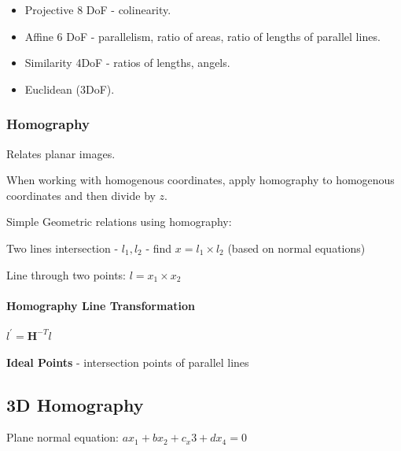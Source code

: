 \begin{itemize}
\item Projective 8 DoF - colinearity.
\item Affine 6 DoF - parallelism, ratio of areas, ratio of lengths of parallel lines.
\item Similarity 4DoF - ratios of lengths, angels.
\item Euclidean (3DoF).
\end{itemize}



\subsubsection{Homography}

Relates planar images.

When working with homogenous coordinates, apply homography to homogenous coordinates and then divide by $z$.

Simple Geometric relations using homography:

Two lines intersection - $l_1,l_2$ - find $x = l_1 \times l_2$  (based on normal equations)

Line through two points: $l = x_1 \times x_2 $

\paragraph{Homography Line Transformation}

$l^\prime = \mathbf{H}^{-T} l$

\textbf{Ideal Points} - intersection points of parallel lines

\subsection{3D Homography}

Plane normal equation: $ax_1 + bx_2 + c_x3 + d x_4 = 0$ 

